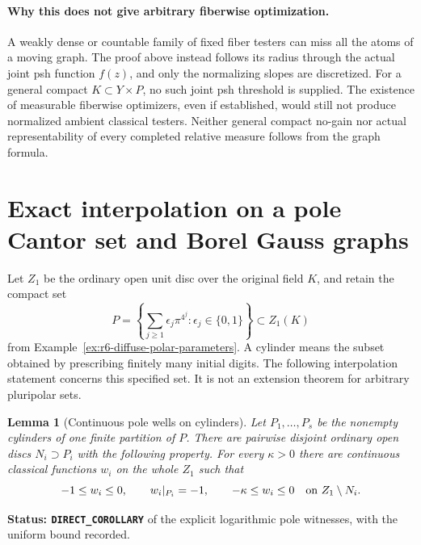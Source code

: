 \documentclass[11pt,a4paper]{article}
\numberwithin{equation}{section}
\newtheorem{lemma}[theorem]{Lemma}
\theoremstyle{definition}
\theoremstyle{remark}
\begin{document}
\paragraph{Why this does not give arbitrary fiberwise optimization.}
A weakly dense or countable family of fixed fiber testers can miss all
the atoms of a moving graph. The proof above instead follows its
radius through the actual joint psh function $f(z)$, and only the
normalizing slopes are discretized. For a general compact
$K\subset Y\times P$, no such joint psh threshold is supplied.
The existence of measurable fiberwise optimizers, even if established,
would still not produce normalized ambient classical testers. Neither
general compact no-gain nor actual representability of every completed
relative measure follows from the graph formula.



\section{Exact interpolation on a pole Cantor set and Borel Gauss graphs}
\label{sec:r6-cantor-borel-graphs}

Let $Z_1$ be the ordinary open unit disc over the original field $K$,
and retain the compact set
\[
 P=\left\{\sum_{j\ge1}\epsilon_j\pi^{4^j}:
                         \epsilon_j\in\{0,1\}\right\}\subset Z_1(K)
\]
from Example~\ref{ex:r6-diffuse-polar-parameters}. A cylinder means
the subset obtained by prescribing finitely many initial digits.
The following interpolation statement concerns this specified set.
It is not an extension theorem for arbitrary pluripolar sets.

\begin{lemma}[Continuous pole wells on cylinders]
\label{lem:r6-cantor-continuous-wells}
Let $P_1,\ldots,P_s$ be the nonempty cylinders of one finite partition
of $P$. There are pairwise disjoint ordinary open discs $N_i\supset P_i$
with the following property. For every $\kappa>0$ there are continuous
classical functions $w_i$ on the whole $Z_1$ such that
\[
 -1\le w_i\le0,\qquad w_i|_{P_i}=-1,
 \qquad -\kappa\le w_i\le0\quad\hbox{on }Z_1\setminus N_i.
\]
\end{lemma}

\noindent\textbf{Status: \texttt{DIRECT\_COROLLARY}} of the
explicit logarithmic pole witnesses, with the uniform bound recorded.
\end{document}
